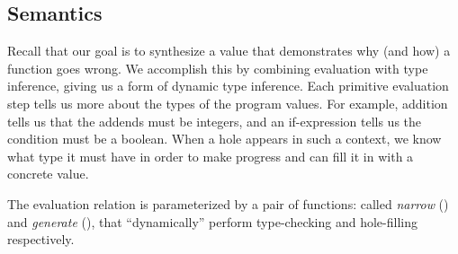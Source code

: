

\subsection{Semantics}
\label{sec:semantics}
%
Recall that our goal is to synthesize a value that demonstrates
why (and how) a function goes wrong.
%
We accomplish this by combining evaluation with type inference,
giving us a form of dynamic type inference.
%
Each primitive evaluation step tells us more about the types of the
program values. For example, addition tells us that the addends must be
integers, and %
an if-expression tells us the condition must be a boolean.
%
When a hole appears in such a context, we know what type it must have
in order to make progress and can fill it in with a concrete value.

The evaluation relation is parameterized by a pair of functions:
called \emph{narrow} (\forcesym) and \emph{generate} (\gensym),
that ``dynamically'' perform type-checking and hole-filling
respectively.

